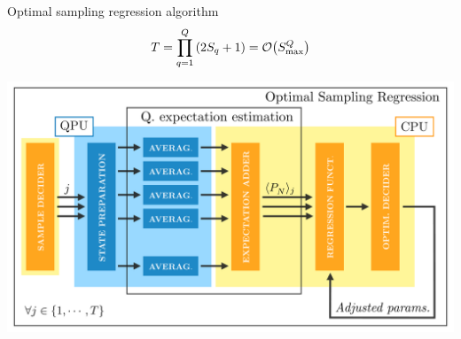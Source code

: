 \documentclass[9pt, handout, aspectratio=169]{beamer}	%
\begin{document}
\begin{frame}[allowframebreaks]{Optimal sampling regression algorithm}
	\begin{gather*}
	  T = \prod_{q=1}^{Q} \qty(2 S_{q} + 1) = \order{S_{\text{max}}^{Q}}
	\end{gather*}

\break

	\begin{center}
		\includegraphics[width=.7\paperwidth]{Figures/NJL1-model-solving/OSR}
	\end{center}

\break



\end{frame}
\end{document}
